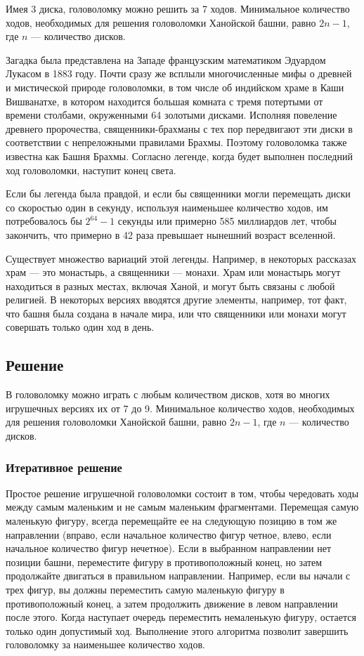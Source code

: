 Имея 3 диска, головоломку можно решить за 7 ходов. Минимальное количество
ходов, необходимых для решения головоломки Ханойской башни, равно $2n - 1$,
где $n$ --- количество дисков.

Загадка была представлена на Западе французским математиком Эдуардом Лукасом в
1883 году. Почти сразу же всплыли\cite{book:2211323} многочисленные мифы о древней и мистической
природе головоломки, в том числе об индийском храме в Каши Вишванатхе, в
котором находится большая комната с тремя потертыми от времени столбами,
окруженными 64 золотыми дисками. Исполняя повеление древнего пророчества,
священники-брахманы с тех пор передвигают эти диски в соответствии с
непреложными правилами Брахмы. Поэтому головоломка также известна как Башня
Брахмы. Согласно легенде, когда будет выполнен последний ход головоломки,
наступит конец света.\cite{book:73336}

Если бы легенда была правдой, и если бы священники могли перемещать диски со
скоростью один в секунду, используя наименьшее количество ходов, им
потребовалось бы $2^{64}-1$ секунды или примерно 585 миллиардов лет, чтобы
закончить, что примерно в 42 раза превышает нынешний возраст вселенной.

Существует множество вариаций этой легенды. Например, в некоторых рассказах
храм --- это монастырь, а священники --- монахи. Храм или монастырь могут
находиться в разных местах, включая Ханой, и могут быть связаны с любой
религией. В некоторых версиях вводятся другие элементы, например, тот факт, что
башня была создана в начале мира, или что священники или монахи могут совершать
только один ход в день.

\subsection{Решение}

В головоломку можно играть с любым количеством дисков, хотя во многих
игрушечных версиях их от 7 до 9. Минимальное количество ходов, необходимых для
решения головоломки Ханойской башни, равно $2n-1$, где $n$ --- количество
дисков.\cite{book:781890}

\subsubsection{Итеративное решение}

Простое решение игрушечной головоломки состоит в том, чтобы чередовать ходы
между самым маленьким и не самым маленьким фрагментами. Перемещая самую
маленькую фигуру, всегда перемещайте ее на следующую позицию в том же
направлении (вправо, если начальное количество фигур четное, влево, если
начальное количество фигур нечетное). Если в выбранном направлении нет позиции
башни, переместите фигуру в противоположный конец, но затем продолжайте
двигаться в правильном направлении. Например, если вы начали с трех фигур, вы
должны переместить самую маленькую фигуру в противоположный конец, а затем
продолжить движение в левом направлении после этого. Когда наступает очередь
переместить немаленькую фигуру, остается только один допустимый ход. Выполнение
этого алгоритма позволит завершить головоломку за наименьшее количество ходов.

